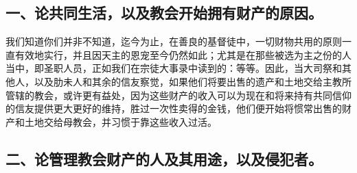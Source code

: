 
\subsection{一、论共同生活，以及教会开始拥有财产的原因。}

我们知道你们并非不知道，迄今为止，在善良的基督徒中，一切财物共用的原则一直有效地实行，并且因天主的恩宠至今仍然如此；尤其是在那些被选为主之份的人当中，即圣职人员，正如我们在宗徒大事录中读到的：等等。因此，当大司祭和其他人，以及肋未人和其余的信友察觉，如果他们将要出售的遗产和土地交给主教所管辖的教会，或许更有益处，因为这些财产的收入可以为现在和将来持有共同信仰的信友提供更大更好的维持，胜过一次性卖得的金钱，他们便开始将惯常出售的财产和土地交给母教会，并习惯于靠这些收入过活。\par


\subsection{二、论管理教会财产的人及其用途，以及侵犯者。}

